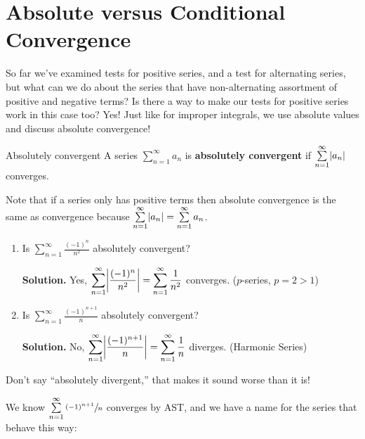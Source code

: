 \section{Absolute versus Conditional Convergence}
So far we've examined tests for positive series, and a test
for alternating series, but what can we do about the series that have
non-alternating assortment of positive and negative terms?
Is there a way to make our tests for positive series work in this case too?
Yes! Just like for improper integrals, we use absolute values
and discuss absolute convergence!

\begin{Definition}{Absolutely convergent}{}
    A series $ \sum\limits_{n=1}^{\infty} a_n $ is \textbf{absolutely convergent}
    if $ \sum\limits_{n=1}^{\infty} \lvert a_n\rvert $ converges.
\end{Definition}

\begin{Remark}{}{}
    Note that if a series only has positive terms then absolute convergence
    is the same as convergence because $ \sum\limits_{n=1}^{\infty} \lvert a_n\rvert=
        \sum\limits_{n=1}^{\infty} a_n $.
\end{Remark}

\begin{Example}{}{}
    \begin{enumerate}
        \item Is $ \displaystyle \sum\limits_{n=1}^{\infty} \frac{(-1)^n}{n^2} $ absolutely
              convergent?

              \textbf{Solution.} Yes, $ \displaystyle \sum\limits_{n=1}^{\infty} \abs*{\frac{(-1)^n}{n^2}}
                  =\sum\limits_{n=1}^{\infty} \frac{1}{n^2} $ converges. ($ p $-series, $ p=2>1 $)
        \item Is $ \displaystyle \sum\limits_{n=1}^{\infty} \frac{(-1)^{n+1}}{n} $ absolutely
              convergent?

              \textbf{Solution.} No, $ \displaystyle \sum\limits_{n=1}^{\infty} \abs*{\frac{(-1)^{n+1}}{n}}=
                  \sum\limits_{n=1}^{\infty} \frac{1}{n} $ diverges. (Harmonic Series)
    \end{enumerate}
\end{Example}

\begin{Remark}{}{}
    Don't say ``absolutely divergent,'' that makes it sound worse than it is!
\end{Remark}

We know $ \sum\limits_{n=1}^{\infty} \sfrac{(-1)^{n+1}}{n} $ converges by AST,
and we have a name for the series that behave this way:

